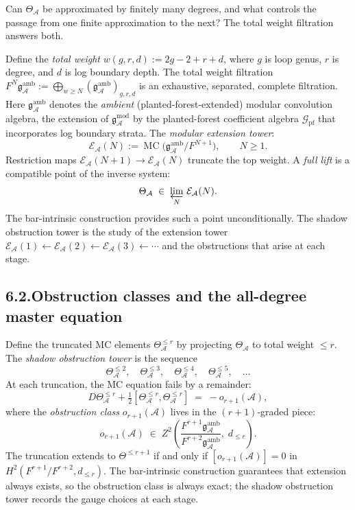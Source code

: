 \documentclass[11pt]{report}
\theoremstyle{definition}
\theoremstyle{remark}
\providecommand{\cA}{\mathcal{A}}
\providecommand{\cE}{\mathcal{E}}
\providecommand{\gAmod}{\mathfrak{g}^{\mathrm{mod}}_\cA}
\numberwithin{equation}{section}
\begin{document}
Can $\Theta_\cA$ be approximated by finitely many
degrees, and what controls the passage from one finite
approximation to the next? The total weight
filtration answers both.

Define the \emph{total weight} $w(g,r,d):=2g-2+r+d$, where $g$ is
loop genus, $r$ is degree, and $d$ is log boundary depth. The total
weight filtration $F^N\mathfrak{g}^{\mathrm{amb}}_\cA:=\bigoplus_{w\ge N}(\mathfrak{g}^{\mathrm{amb}}_\cA)_{g,r,d}$
is an exhaustive, separated, complete filtration. Here
$\mathfrak g^{\mathrm{amb}}_\cA$ denotes the \emph{ambient}
(planted-forest-extended) modular convolution algebra, the
extension of $\gAmod$ by the planted-forest coefficient algebra
$\mathcal G_{\mathrm{pf}}$ that incorporates log boundary
strata. The \emph{modular extension tower}:
\[
\cE_\cA(N)
:=\operatorname{MC}\bigl(\mathfrak g^{\mathrm{amb}}_\cA/F^{N+1}\bigr),
\qquad N\ge 1.
\]
Restriction maps
$\cE_\cA(N+1)\to\cE_\cA(N)$ truncate the top weight. A
\emph{full lift} is a compatible point of the inverse system:
\[
\Theta_\cA\;\in\;
\varprojlim_{N}\,\cE_\cA(N).
\]
The bar-intrinsic construction provides such a point
unconditionally. The shadow obstruction tower is the study of the
extension tower $\cE_\cA(1)\leftarrow
\cE_\cA(2)\leftarrow\cE_\cA(3)\leftarrow\cdots$ and the
obstructions that arise at each stage.

\subsection*{6.2.\enspace Obstruction classes and the all-degree master equation}

Define the truncated MC elements $\Theta_\cA^{\le r}$ by projecting
$\Theta_\cA$ to total weight $\le r$. The \emph{shadow obstruction
tower} is the sequence
\[
\Theta_\cA^{\le 2},\quad
\Theta_\cA^{\le 3},\quad
\Theta_\cA^{\le 4},\quad
\Theta_\cA^{\le 5},\quad\dots
\]
At each truncation, the MC equation fails by a remainder:
\[
D\Theta^{\le r}_\cA
+\tfrac12[\Theta^{\le r}_\cA,\Theta^{\le r}_\cA]
\;=\;
-o_{r+1}(\cA),
\]
where the \emph{obstruction class} $o_{r+1}(\cA)$ lives in the
$(r+1)$-graded piece:
\[
o_{r+1}(\cA)
\;\in\;
Z^2\!\left(\frac{F^{r+1}\mathfrak g^{\mathrm{amb}}_\cA}
{F^{r+2}\mathfrak g^{\mathrm{amb}}_\cA},\;d_{\le r}\right).
\]
The truncation extends to
$\Theta^{\le r+1}$ if and only if $[o_{r+1}(\cA)]=0$ in
$H^2(F^{r+1}/F^{r+2},d_{\le r})$. The bar-intrinsic
construction guarantees that extension always exists, so
the obstruction class is always exact; the shadow obstruction tower
records the gauge choices at each stage.
\end{document}
